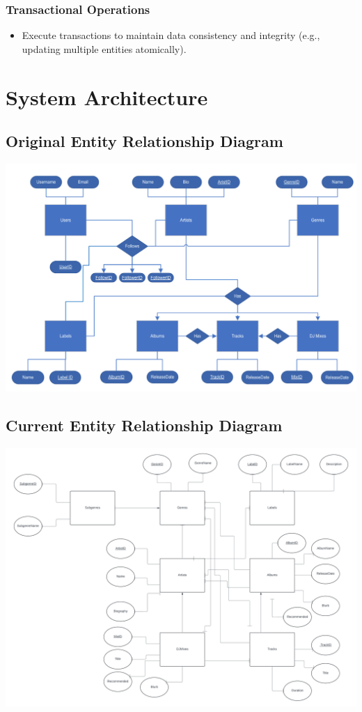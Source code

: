 \documentclass{article}
\begin{document}
\subsubsection{Transactional Operations}
\begin{itemize}
    \item Execute transactions to maintain data consistency and integrity (e.g., updating multiple entities atomically).
\end{itemize}



\section{System Architecture}

\subsection{Original Entity Relationship Diagram}
\includegraphics[width=\linewidth]{original_ER_diagram.png}

\subsection{Current Entity Relationship Diagram}
\includegraphics[width=\linewidth]{current_ER_diagram.png}
\end{document}
